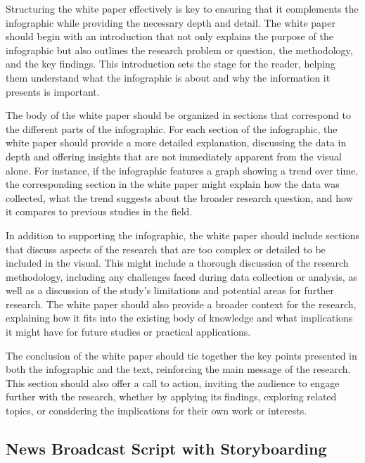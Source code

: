 \documentclass[
]{book}
\begin{document}
Structuring the white paper effectively is key to ensuring that it complements the infographic while providing the necessary depth and detail. The white paper should begin with an introduction that not only explains the purpose of the infographic but also outlines the research problem or question, the methodology, and the key findings. This introduction sets the stage for the reader, helping them understand what the infographic is about and why the information it presents is important.

The body of the white paper should be organized in sections that correspond to the different parts of the infographic. For each section of the infographic, the white paper should provide a more detailed explanation, discussing the data in depth and offering insights that are not immediately apparent from the visual alone. For instance, if the infographic features a graph showing a trend over time, the corresponding section in the white paper might explain how the data was collected, what the trend suggests about the broader research question, and how it compares to previous studies in the field.

In addition to supporting the infographic, the white paper should include sections that discuss aspects of the research that are too complex or detailed to be included in the visual. This might include a thorough discussion of the research methodology, including any challenges faced during data collection or analysis, as well as a discussion of the study's limitations and potential areas for further research. The white paper should also provide a broader context for the research, explaining how it fits into the existing body of knowledge and what implications it might have for future studies or practical applications.

The conclusion of the white paper should tie together the key points presented in both the infographic and the text, reinforcing the main message of the research. This section should also offer a call to action, inviting the audience to engage further with the research, whether by applying its findings, exploring related topics, or considering the implications for their own work or interests.

\subsection*{News Broadcast Script with Storyboarding}\label{news-broadcast-script-with-storyboarding}
\end{document}
